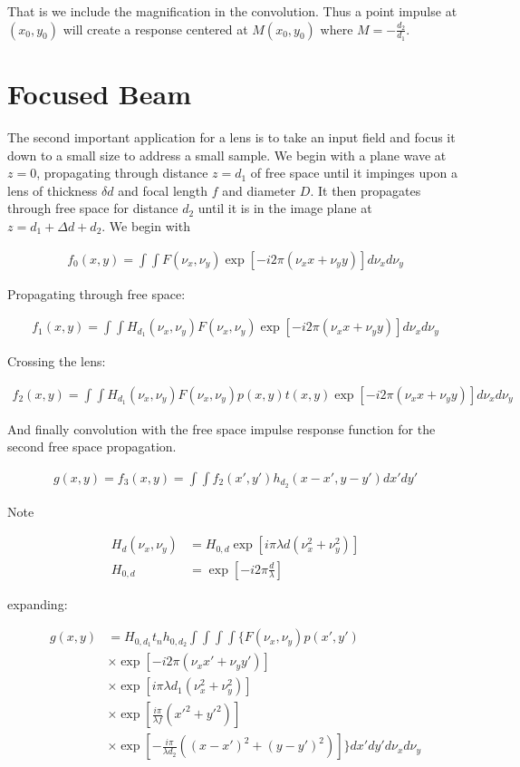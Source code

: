 \documentclass[12pt]{article}
\begin{document}
That is we include the magnification in the convolution. Thus a point impulse at $(x_0,y_0)$ will create a response centered at $M(x_0,y_0)$ where $M = -\frac{d_2}{d_1}$.

\section{Focused Beam}

The second important application for a lens is to take an input field and focus it down to a small size to address a small sample. We begin with a plane wave at $z=0$, propagating through distance $z=d_1$ of free space until it impinges upon a lens of thickness $\delta d$ and focal length $f$ and diameter $D$. It then propagates through free space for distance $d_2$ until it is in the image plane at $z=d_1+\Delta d + d_2$. We begin with

\begin{align}
f_0(x,y) = \int \int F(\nu_x, \nu_y) \exp[-i 2\pi (\nu_x x + \nu_y y)] d\nu_x d\nu_y
\end{align}

Propagating through free space:

\begin{align}
f_1(x,y) = \int \int H_{d_1}(\nu_x,\nu_y) F(\nu_x, \nu_y) \exp[-i 2\pi (\nu_x x + \nu_y y)] d\nu_x d\nu_y
\end{align}

Crossing the lens:

\begin{align}
f_2(x,y) = \int \int H_{d_1}(\nu_x,\nu_y) F(\nu_x, \nu_y) p(x,y)t(x,y) \exp[-i 2\pi (\nu_x x + \nu_y y)] d\nu_x d\nu_y
\end{align}

And finally convolution with the free space impulse response function for the second free space propagation.

\begin{align}
g(x,y) = f_3(x,y) = \int \int f_2(x',y') h_{d_2}(x-x',y-y') dx' dy'
\end{align}

Note

\begin{align}
H_{d}(\nu_x,\nu_y) &= H_{0,d} \exp[i\pi \lambda d(\nu_x^2+\nu_y^2)]\\
H_{0,d} &= \exp\left[-i 2\pi \frac{d}{\lambda}\right]
\end{align}

expanding:

\begin{align}
g(x,y) &= H_{0,d_1} t_n h_{0,d_2} \int \int \int \int \Bigg\{F(\nu_x,\nu_y) p(x',y')\\
&\times \exp[-i 2\pi (\nu_x x' + \nu_y y')]\\
&\times \exp[i\pi \lambda d_1(\nu_x^2+\nu_y^2)]\\
&\times \exp\left[ \frac{i \pi}{\lambda f} (x'^2+y'^2)\right]\\
&\times \exp\left[ -\frac{i \pi}{\lambda d_2} ((x-x')^2+(y-y')^2)\right] \Bigg\}dx' dy' d\nu_x d\nu_y
\end{align}
\end{document}
